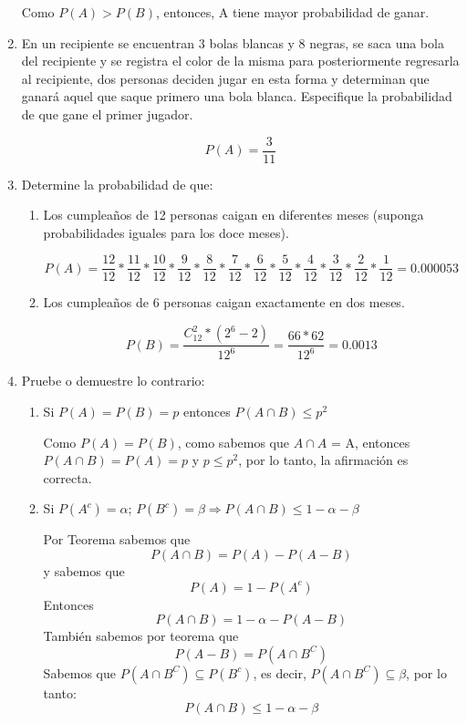 \documentclass[letterpaper,11pt]{article}
\renewcommand{%
	\contentsname}{\vspace{-1cm} \hfill\bfseries\LARGE Índice \hfill \vspace{0.2cm}%
}
\begin{document}
\begin{enumerate}
Como $P(A)>P(B)$, entonces, A tiene mayor probabilidad de ganar.

\item En un recipiente se encuentran 3 bolas blancas y 8 negras, se saca una bola del recipiente y se registra el color de la misma para posteriormente regresarla al recipiente, dos personas deciden jugar en esta forma y determinan que ganará aquel que saque primero una bola blanca. Especifique la probabilidad de que gane el primer jugador.

$$
P(A) = \frac{3}{11}
$$

\item Determine la probabilidad de que: 
\begin{enumerate}
	\item Los cumpleaños de 12 personas caigan en diferentes meses (suponga probabilidades iguales para los doce meses).
	
	$$
	P(A)= \frac{12}{12} * \frac{11}{12} * \frac{10}{12} * \frac{9}{12} * \frac{8}{12} * \frac{7}{12} * \frac{6}{12} * \frac{5}{12} * \frac{4}{12} * \frac{3}{12} * \frac{2}{12} * \frac{1}{12}= 0.000053
	$$

	\item Los cumpleaños de 6 personas caigan exactamente en dos meses. 
	
	$$
	P (B) = \frac{C_12^2 * (2^6 - 2) }{12^6} = \frac{66 * 62}{12^6} = 0.0013
	$$


\end{enumerate}

\item Pruebe o demuestre lo contrario:  
\begin{enumerate}
	\item Si  $P(A)=P(B)=p$ entonces $P(A\cap B)\leq p^2$
	
	Como $P(A) = P(B)$, como sabemos que $A \cap A$ = A, entonces $P(A\cap B) = P(A)= p$ y $p \leq p^2$, por lo tanto, la afirmación es correcta. 

	\item Si $P(A^c) = \alpha $; $P(B^c)= \beta \Rightarrow  P(A\cap B)\leq 1 - \alpha - \beta $ 
	
	Por Teorema sabemos que
	$$P(A \cap B) = P(A)-P(A-B)$$
	y sabemos que 
	$$P(A)=1-P(A^c)$$ Entonces 
	$$P(A \cap B) = 1 - \alpha - P(A-B)$$	
	También sabemos por teorema que 
	$$P(A-B)= P(A \cap B^C)$$ %
	Sabemos que $P(A \cap B^C)  \subseteq P(B^c)$, es decir, $P(A \cap B^C)  \subseteq  \beta$, por lo tanto:
	$$
	P(A\cap B)\leq 1 - \alpha - \beta
	$$


\end{enumerate}
\end{enumerate}
\end{document}
